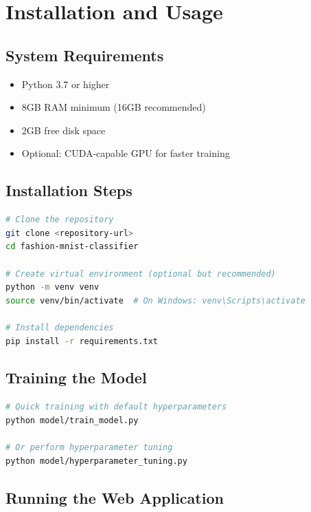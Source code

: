 \documentclass[12pt,a4paper]{article}
\begin{document}
\appendix

\section{Installation and Usage}

\subsection{System Requirements}
\begin{itemize}
    \item Python 3.7 or higher
    \item 8GB RAM minimum (16GB recommended)
    \item 2GB free disk space
    \item Optional: CUDA-capable GPU for faster training
\end{itemize}

\subsection{Installation Steps}

\begin{lstlisting}[language=bash, caption={Installation Commands}]
# Clone the repository
git clone <repository-url>
cd fashion-mnist-classifier

# Create virtual environment (optional but recommended)
python -m venv venv
source venv/bin/activate  # On Windows: venv\Scripts\activate

# Install dependencies
pip install -r requirements.txt
\end{lstlisting}

\subsection{Training the Model}

\begin{lstlisting}[language=bash, caption={Model Training}]
# Quick training with default hyperparameters
python model/train_model.py

# Or perform hyperparameter tuning
python model/hyperparameter_tuning.py
\end{lstlisting}

\subsection{Running the Web Application}
\end{document}
